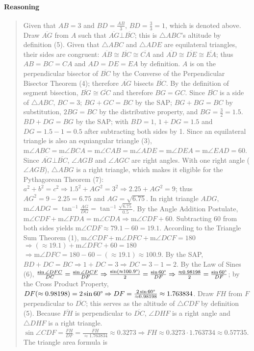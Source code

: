 \documentclass[letterpaper,12pt,twoside]{report}
\begin{document}
	\paragraph{Reasoning}
	\begin{quotation}
		
		Given that $AB=3$ and $BD=\frac{AB}{3}$, $BD=\frac{3}{3}=1$, which is denoted above. Draw $\overline{AG}$ from $A$ such that $\overline{AG} \bot \overline{BC}$; this is $\triangle ABC$'s altitude by definition (5). Given that $\triangle ABC$ and $\triangle ADE$ are equilateral triangles, their sides are congruent: $\overline{AB}\cong\overline{BC}\cong\overline{CA}$ and $\overline{AD}\cong\overline{DE}\cong\overline{EA}$; thus $AB=BC=CA$ and $AD=DE=EA$ by definition. $A$ is on the perpendicular bisector of $\overline{BC}$ by the Converse of the Perpendicular Bisector Theorem (4); therefore $\overline{AG}$ bisects $\overline{BC}$. By the definition of segment bisection, $\overline{BG}\cong\overline{GC}$ and therefore $BG=GC$. Since $\overline{BC}$ is a side of $\triangle ABC$, $BC=3$; $BG+GC=BC$ by the SAP; $BG+BG=BC$ by substitution, $2BG=BC$ by the distributive property, and $BG=\frac{3}{2}=1.5$. $BD+DG=BG$ by the SAP; with $BD=1$, $1+DG=1.5$ and $DG=1.5-1=0.5$ after subtracting both sides by 1. Since an equilateral triangle is also an equiangular triangle (3), $\text{m}\angle ABC=\text{m}\angle BCA=\text{m}\angle CAB=\text{m}\angle ADE=\text{m}\angle DEA=\text{m}\angle EAD=60$\textdegree. Since $\overline{AG}\bot\overline{BC}$, $\angle AGB$ and $\angle AGC$ are right angles. With one right angle ($\angle AGB$), $\triangle ABG$ is a right triangle, which makes it eligible for the Pythagorean Theorem (7): $a^2+b^2=c^2 \Rightarrow 1.5^2+AG^2=3^2 \Rightarrow 2.25+AG^2=9$; thus $AG^2=9-2.25=6.75$ and $AG=\sqrt{6.75}$. In right triangle $ADG$, $\text{m}\angle ADG = \tan^{-1} \frac{AG}{DG}=\tan^{-1} \frac{\sqrt{6.75}}{0.5}$. By the Angle Addition Postulate, $\text{m}\angle CDF+\text{m}\angle FDA=\text{m}\angle CDA \Rightarrow \text{m}\angle CDF+60$. Subtracting 60 from both sides yields $\text{m}\angle CDF\approx 79.1-60=19.1$\textdegree. According to the Triangle Sum Theorem (1), $\text{m}\angle CDF+\text{m}\angle DFC+\text{m}\angle DCF=180$\textdegree $\Rightarrow (\approx 19.1)+\text{m}\angle DFC+60$\textdegree$=180$\textdegree $\Rightarrow \text{m}\angle DFC=180-60-(\approx 19.1)\approx 100.9$\textdegree. By the SAP, $BD+DC=BC \Rightarrow 1+DC=3 \Rightarrow DC=3-1=2$. By the Law of Sines (6), $\frac{\sin \angle DFC}{DC}=\frac{\sin \angle DCF}{DF} \Rightarrow \frac{\sin (\approx 100.9\text{\textdegree})}{2}=\frac{\sin 60\text{\textdegree}}{DF} \Rightarrow \frac{\approx 0.98198}{2}=\frac{\sin 60\text{\textdegree}}{DF}$; by the Cross Product Property, $DF(\approx 0.98198)=2 \sin 60\text{\textdegree} \Rightarrow DF=\frac{2 \sin 60\text{\textdegree}}{\approx 0.98198}\approx 1.763834$. Draw $FH$ from $F$ perpendicular to $\overline{DC}$; this serves as the altitude of $\triangle CDF$ by definition (5). Because $\overline{FH}$ is perpendicular to $\overline{DC}$, $\angle DHF$ is a right angle and $\triangle DHF$ is a right triangle. $\sin \angle CDF=\frac{FH}{DF}=\frac{FH}{\approx 1.763834}\approx 0.3273 \Rightarrow FH\approx 0.3273 \cdot 1.763734\approx 0.57735$. The triangle area formula is 
\end{quotation}
\end{document}
